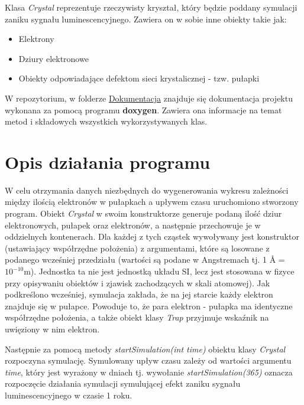Klasa \textit{Crystal} reprezentuje rzeczywisty kryształ, który będzie poddany symulacji zaniku sygnału luminescencyjnego. Zawiera on w sobie inne obiekty takie jak:

\begin{itemize}
\item Elektrony
\item Dziury elektronowe
\item Obiekty odpowiadające defektom sieci krystalicznej - tzw. pułapki
\end{itemize}

W repozytorium, w folderze \href{www}{Dokumentacja} znajduje się dokumentacja projektu wykonana za pomocą programu \textbf{doxygen}. Zawiera ona informacje na temat metod i składowych wszystkich wykorzystywanych klas.


\section{Opis działania programu}



W celu otrzymania danych niezbędnych do wygenerowania wykresu zależności między ilością elektronów w pułapkach a upływem czasu uruchomiono stworzony program. Obiekt \textit{Crystal} w swoim konstruktorze generuje podaną ilość dziur elektronowych, pułapek oraz elektronów, a następnie przechowuje je w oddzielnych kontenerach. Dla każdej z tych cząstek wywoływany jest konstruktor (ustawiający współrzędne położenia) z argumentami, które są losowane z podanego wcześniej przedziału (wartości są podane w Angstremach tj. 1 Å = $10^{-10}$m). Jednostka ta nie jest jednostką układu SI, lecz jest stosowana w fizyce przy opisywaniu obiektów i zjawisk zachodzących w skali atomowej). Jak podkreślono wcześniej, symulacja zakłada, że na jej starcie każdy elektron znajduje się w pułapce. Powoduje to, że para elektron - pułapka ma identyczne współrzędne położenia, a także obiekt klasy \textit{Trap} przyjmuje wskaźnik na uwięziony w nim elektron.

Następnie za pomocą metody \textit{startSimulation(int time)} obiektu klasy \textit{Crystal} rozpoczyna symulację. Symulowany upływ czasu  zależy od wartości argumentu \textit{time}, który jest wyrażony w dniach tj. wywołanie \emph{startSimulation(365)} oznacza rozpoczęcie działania symulacji symulującej efekt zaniku sygnału luminescencyjnego w czasie 1 roku.


